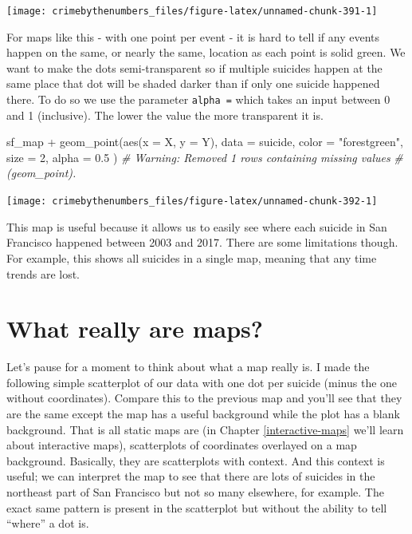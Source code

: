 \documentclass[
]{krantz}
\makeatletter
\newenvironment{Shaded}{\begin{snugshade}}{\end{snugshade}}
\newcommand{\AttributeTok}[1]{\textcolor[rgb]{0.61,0.61,0.61}{#1}}
\newcommand{\CommentTok}[1]{\textcolor[rgb]{0.37,0.37,0.37}{\textit{#1}}}
\newcommand{\DecValTok}[1]{\textcolor[rgb]{0.06,0.06,0.06}{#1}}
\newcommand{\FloatTok}[1]{\textcolor[rgb]{0.06,0.06,0.06}{#1}}
\newcommand{\FunctionTok}[1]{\textcolor[rgb]{0,0,0}{#1}}
\newcommand{\NormalTok}[1]{#1}
\newcommand{\SpecialCharTok}[1]{\textcolor[rgb]{0,0,0}{#1}}
\newcommand{\StringTok}[1]{\textcolor[rgb]{0.5,0.5,0.5}{#1}}
\newenvironment{kframe}{%
\medskip{}
\setlength{\fboxsep}{.8em}
 \def\at@end@of@kframe{}%
 \ifinner\ifhmode%
  \def\at@end@of@kframe{\end{minipage}}%
  \begin{minipage}{\columnwidth}%
 \fi\fi%
 \def\FrameCommand##1{\hskip\@totalleftmargin \hskip-\fboxsep
 \colorbox{shadecolor}{##1}\hskip-\fboxsep
     \hskip-\linewidth \hskip-\@totalleftmargin \hskip\columnwidth}%
 \MakeFramed {\advance\hsize-\width
   \@totalleftmargin\z@ \linewidth\hsize
   \@setminipage}}%
 {\par\unskip\endMakeFramed%
 \at@end@of@kframe}
\renewenvironment{Shaded}{\begin{kframe}}{\end{kframe}}
\makeatother
\begin{document}
\begin{center}\texttt{[image: crimebythenumbers\_files/figure-latex/unnamed-chunk-391-1]} \end{center}

For maps like this - with one point per event - it is hard
to tell if any events happen on the same, or nearly the
same, location as each point is solid green. We want to make
the dots semi-transparent so if multiple suicides happen at
the same place that dot will be shaded darker than if only
one suicide happened there. To do so we use the parameter
\texttt{alpha\ =} which takes an input between 0 and 1
(inclusive). The lower the value the more transparent it is.

\begin{Shaded}
\begin{Highlighting}[]
\NormalTok{sf\_map }\SpecialCharTok{+}
  \FunctionTok{geom\_point}\NormalTok{(}\FunctionTok{aes}\NormalTok{(}\AttributeTok{x =}\NormalTok{ X, }\AttributeTok{y =}\NormalTok{ Y),}
    \AttributeTok{data  =}\NormalTok{ suicide,}
    \AttributeTok{color =} \StringTok{"forestgreen"}\NormalTok{,}
    \AttributeTok{size  =} \DecValTok{2}\NormalTok{,}
    \AttributeTok{alpha =} \FloatTok{0.5}
\NormalTok{  )}
\CommentTok{\# Warning: Removed 1 rows containing missing values}
\CommentTok{\# (geom\_point).}
\end{Highlighting}
\end{Shaded}

\begin{center}\texttt{[image: crimebythenumbers\_files/figure-latex/unnamed-chunk-392-1]} \end{center}

This map is useful because it allows us to easily see where
each suicide in San Francisco happened between 2003 and
2017. There are some limitations though. For example, this
shows all suicides in a single map, meaning that any time
trends are lost.

\hypertarget{what-really-are-maps}{%
\section{What really are maps?}\label{what-really-are-maps}}

Let's pause for a moment to think about what a map really
is. I made the following simple scatterplot of our data with
one dot per suicide (minus the one without coordinates).
Compare this to the previous map and you'll see that they
are the same except the map has a useful background while
the plot has a blank background. That is all static maps are
(in Chapter \ref{interactive-maps} we'll learn about
interactive maps), scatterplots of coordinates overlayed on
a map background. Basically, they are scatterplots with
context. And this context is useful; we can interpret the
map to see that there are lots of suicides in the northeast
part of San Francisco but not so many elsewhere, for
example. The exact same pattern is present in the
scatterplot but without the ability to tell ``where'' a dot
is.
\end{document}
